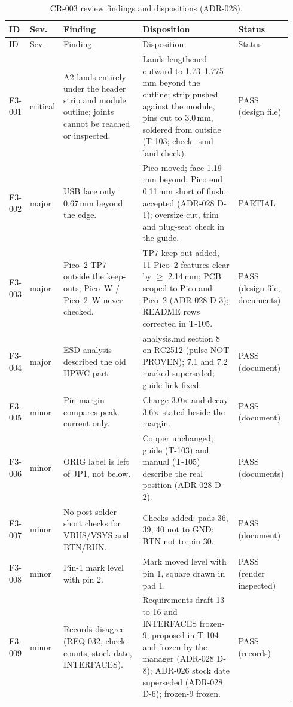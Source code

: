 {\footnotesize
\begin{longtable}{@{}>{\raggedright\arraybackslash}p{0.07\linewidth}>{\raggedright\arraybackslash}p{0.07\linewidth}>{\raggedright\arraybackslash}p{0.30\linewidth}>{\raggedright\arraybackslash}p{0.40\linewidth}>{\raggedright\arraybackslash}p{0.10\linewidth}@{}}
\caption{CR-003 review findings and dispositions (ADR-028).}\label{tab:review-cr003}\\
\toprule
ID & Sev. & Finding & Disposition & Status \\
\midrule\endfirsthead
\toprule ID & Sev. & Finding & Disposition & Status \\ \midrule\endhead
F3-001 & critical & A2 lands entirely under the header strip and module outline; joints cannot be reached or inspected. & Lands lengthened outward to 1.73--1.775\,mm beyond the outline; strip pushed against the module, pins cut to 3.0\,mm, soldered from outside (T-103; check\_smd land check). & PASS (design file) \\
F3-002 & major & USB face only 0.67\,mm beyond the edge. & Pico moved; face 1.19\,mm beyond, Pico end 0.11\,mm short of flush, accepted (ADR-028 D-1); oversize cut, trim and plug-seat check in the guide. & PARTIAL \\
F3-003 & major & Pico~2 TP7 outside the keep-outs; Pico~W / Pico~2~W never checked. & TP7 keep-out added, 11 Pico~2 features clear by $\ge$ 2.14\,mm; PCB scoped to Pico and Pico~2 (ADR-028 D-3); README rows corrected in T-105. & PASS (design file, documents) \\
F3-004 & major & ESD analysis described the old HPWC part. & analysis.md section 8 on RC2512 (pulse NOT PROVEN); 7.1 and 7.2 marked superseded; guide link fixed. & PASS (document) \\
F3-005 & minor & Pin margin compares peak current only. & Charge 3.0$\times$ and decay 3.6$\times$ stated beside the margin. & PASS (document) \\
F3-006 & minor & ORIG label is left of JP1, not below. & Copper unchanged; guide (T-103) and manual (T-105) describe the real position (ADR-028 D-2). & PASS (documents) \\
F3-007 & minor & No post-solder short checks for VBUS/VSYS and BTN/RUN. & Checks added: pads 36, 39, 40 not to GND; BTN not to pin 30. & PASS (document) \\
F3-008 & minor & Pin-1 mark level with pin 2. & Mark moved level with pin 1, square drawn in pad 1. & PASS (render inspected) \\
F3-009 & minor & Records disagree (REQ-032, check counts, stock date, INTERFACES). & Requirements draft-13 to 16 and INTERFACES frozen-9, proposed in T-104 and frozen by the manager (ADR-028 D-8); ADR-026 stock date superseded (ADR-028 D-6); frozen-9 frozen. & PASS (records) \\

\end{longtable}}
